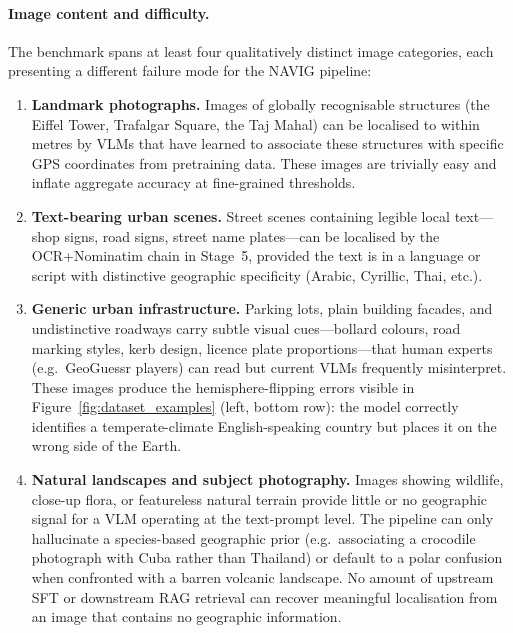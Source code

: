 \documentclass[11pt]{article}
\begin{document}
\paragraph{Image content and difficulty.}
The benchmark spans at least four qualitatively distinct image categories, each
presenting a different failure mode for the NAVIG pipeline:

\begin{enumerate}[noitemsep]
  \item \textbf{Landmark photographs.} Images of globally recognisable structures
    (the Eiffel Tower, Trafalgar Square, the Taj Mahal) can be localised to within
    metres by VLMs that have learned to associate these structures with specific
    GPS coordinates from pretraining data. These images are trivially easy and
    inflate aggregate accuracy at fine-grained thresholds.

  \item \textbf{Text-bearing urban scenes.} Street scenes containing legible local
    text---shop signs, road signs, street name plates---can be localised by the
    OCR+Nominatim chain in Stage~5, provided the text is in a language or script
    with distinctive geographic specificity (Arabic, Cyrillic, Thai, etc.).

  \item \textbf{Generic urban infrastructure.} Parking lots, plain building
    facades, and undistinctive roadways carry subtle visual cues---bollard
    colours, road marking styles, kerb design, licence plate proportions---that
    human experts (e.g.\ GeoGuessr players) can read but current VLMs frequently
    misinterpret. These images produce the hemisphere-flipping errors visible in
    Figure~\ref{fig:dataset_examples} (left, bottom row): the model correctly
    identifies a temperate-climate English-speaking country but places it on the
    wrong side of the Earth.

  \item \textbf{Natural landscapes and subject photography.} Images showing
    wildlife, close-up flora, or featureless natural terrain provide little or no
    geographic signal for a VLM operating at the text-prompt level. The pipeline
    can only hallucinate a species-based geographic prior (e.g.\ associating a
    crocodile photograph with Cuba rather than Thailand) or default to a polar
    confusion when confronted with a barren volcanic landscape. No amount of
    upstream SFT or downstream RAG retrieval can recover meaningful localisation
    from an image that contains no geographic information.
\end{enumerate}
\end{document}
